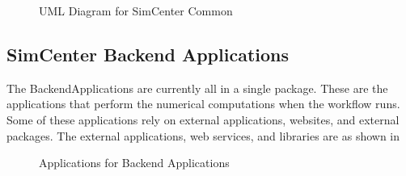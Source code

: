  

\begin{figure}[!htbp]
  \caption{UML Diagram for SimCenter Common}
  \label{fig:umlCommon}
\end{figure}
 


\subsection{SimCenter Backend Applications}

The BackendApplications are currently all in a single package. These are the applications that perform the numerical computations when the workflow runs. Some of these applications rely on external applications, websites, and external packages.  The external applications, web services, and libraries are as shown in 


\begin{figure}[!htbp]
  \caption{Applications for Backend Applications}
  \label{fig:appDiagramBackend}
\end{figure}
 

